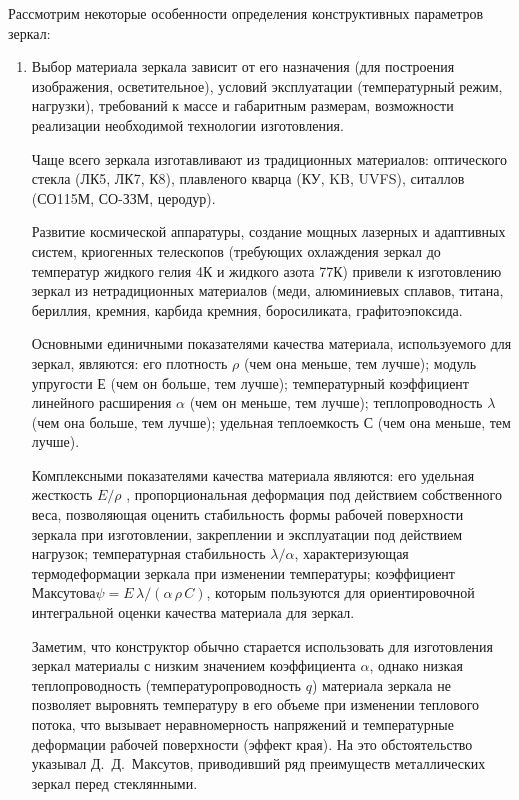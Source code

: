 Рассмотрим некоторые особенности определения конструктивных параметров зеркал:
\begin{enumerate}[leftmargin=*]
\item Выбор материала зеркала зависит от его назначения (для построения изображения, осветительное), условий эксплуатации (температурный режим, нагрузки), требований к массе и габаритным размерам, возможности реализации необходимой технологии изготовления. 

Чаще всего зеркала изготавливают из традиционных материалов: оптического стекла (ЛК5, ЛК7, К8), плавленого кварца (КУ, KB, UVFS), ситаллов (СО115М, СО-ЗЗМ, церодур).

Развитие космической аппаратуры, создание мощных лазерных и адаптивных систем, криогенных телескопов (требующих охлаждения зеркал до температур жидкого гелия 4К и жидкого азота 77К) привели к изготовлению зеркал из нетрадиционных материалов (меди, алюминиевых сплавов, титана, бериллия, кремния, карбида кремния, боросиликата, графитоэпоксида.

Основными единичными показателями качества материала, используемого для зеркал, являются: его плотность $ \rho $ (чем она меньше, тем лучше); модуль упругости $ Е $ (чем он больше, тем лучше); температурный коэффициент линейного расширения $ \alpha $ (чем он меньше, тем лучше); теплопроводность $ \lambda $ (чем она больше, тем лучше); удельная теплоемкость $ С $ (чем она меньше, тем лучше).

Комплексными показателями качества материала являются: его удельная жесткость $ E/\rho $ , пропорциональная деформация под действием собственного веса, позволяющая оценить стабильность формы рабочей поверхности зеркала при изготовлении, закреплении и эксплуатации под действием нагрузок; температурная стабильность $ \lambda/\alpha $, характеризующая термодеформации зеркала при изменении температуры; коэффициент Максутова$ \psi = E\,\lambda/(\alpha\,\rho\,C) $, которым пользуются для ориентировочной интегральной оценки качества материала для зеркал.

Заметим, что конструктор обычно старается использовать для изготовления зеркал материалы с низким значением коэффициента $ \alpha $, однако низкая теплопроводность (температуропроводность $ q $) материала зеркала не позволяет выровнять температуру в его объеме при изменении теплового потока, что вызывает неравномерность напряжений и температурные деформации рабочей поверхности (эффект края). На это обстоятельство указывал Д.~Д.~Максутов, приводивший ряд преимуществ металлических зеркал перед стеклянными.


\end{enumerate}

